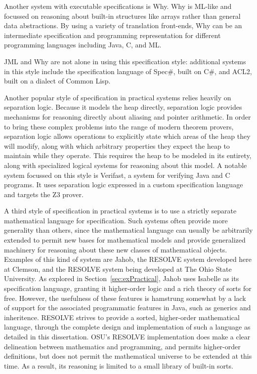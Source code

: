 Another system with executable specifications is Why\cite{bobotWhy}.  Why is ML-like and focussed on reasoning about built-in structures like arrays rather than general data abstractions.  By using a variety of translation front-ends, Why can be an intermediate specification and programming representation for different programming languages including Java, C, and ML\cite{bobotWhy}.

JML and Why are not alone in using this specification style: additional systems in this style include the specification language of Spec\#\cite{specsharp}, built on C\#, and ACL2\cite{kaufmannACL2}, built on a dialect of Common Lisp.

Another popular style of specification in practical systems relies heavily on separation logic\cite{reynoldsSeparationLogic}.  Because it models the heap directly, separation logic provides mechanisms for reasoning directly about aliasing and pointer arithmetic.  In order to bring these complex problems into the range of modern theorem provers, separation logic allows operations to explicitly state which areas of the heap they will modify, along with which arbitrary properties they expect the heap to maintain while they operate.  This requires the heap to be modeled in its entirety, along with specialized logical systems for reasoning about this model.  A notable system focussed on this style is Verifast\cite{jacobsVerifast}, a system for verifying Java and C programs.  It uses separation logic expressed in a custom specification language and targets the Z3 prover\cite{jacobsVerifast}.

A third style of specification in practical systems is to use a strictly separate mathematical language for specification.  Such systems often provide more generality than others, since the mathematical language can usually be arbitrarily extended to permit new bases for mathematical models and provide generalized machinery for reasoning about these new classes of mathematical objects.  Examples of this kind of system are Jahob, the RESOLVE system developed here at Clemson, and the RESOLVE system being developed at The Ohio State University.  As explored in Section~\ref{sec:exPractical}, Jahob uses Isabelle as its specification language, granting it higher-order logic and a rich theory of sorts for free.  However, the usefulness of these features is hamstrung somewhat by a lack of support for the associated programmatic features in Java, such as generics and inheritence.  RESOLVE strives to provide a sorted, higher-order mathematical language, through the complete design and implementation of such a language as detailed in this dissertation.  OSU's RESOLVE implementation does make a clear delineation between mathematics and programming, and permits higher-order definitions, but does not permit the mathematical universe to be extended at this time.  As a result, its reasoning is limited to a small library of built-in sorts.

